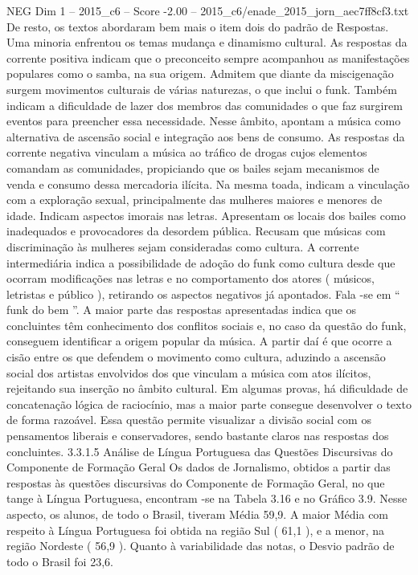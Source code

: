 \begin{textsample}{NEG Dim 1 – 2015\_c6 – Score -2.00 – 2015\_c6/enade\_2015\_jorn\_aec7ff8cf3.txt}
De resto, os textos abordaram bem mais o item dois do padrão de Respostas.
Uma minoria enfrentou os temas mudança e dinamismo cultural.
As respostas da corrente positiva indicam que o preconceito sempre acompanhou as manifestações populares como o samba, na sua origem.
Admitem que diante da miscigenação surgem movimentos culturais de várias naturezas, o que inclui o funk.
Também indicam a dificuldade de lazer dos membros das comunidades o que faz surgirem eventos para preencher essa necessidade.
Nesse âmbito, apontam a música como alternativa de ascensão social e integração aos bens de consumo.
As respostas da corrente negativa vinculam a música ao tráfico de drogas cujos elementos comandam as comunidades, propiciando que os bailes sejam mecanismos de venda e consumo dessa mercadoria ilícita.
Na mesma toada, indicam a vinculação com a exploração sexual, principalmente das mulheres maiores e menores de idade.
Indicam aspectos imorais nas letras.
Apresentam os locais dos bailes como inadequados e provocadores da desordem pública.
Recusam que músicas com discriminação às mulheres sejam consideradas como cultura.
A corrente intermediária indica a possibilidade de adoção do funk como cultura desde que ocorram modificações nas letras e no comportamento dos atores ( músicos, letristas e público ), retirando os aspectos negativos já apontados.
Fala -se em “ funk do bem ”.
A maior parte das respostas apresentadas indica que os concluintes têm conhecimento dos conflitos sociais e, no caso da questão do funk, conseguem identificar a origem popular da música.
A partir daí é que ocorre a cisão entre os que defendem o movimento como cultura, aduzindo a ascensão social dos artistas envolvidos dos que vinculam a música com atos ilícitos, rejeitando sua inserção no âmbito cultural.
Em algumas provas, há dificuldade de concatenação lógica de raciocínio, mas a maior parte consegue desenvolver o texto de forma razoável.
Essa questão permite visualizar a divisão social com os pensamentos liberais e conservadores, sendo bastante claros nas respostas dos concluintes. 3.3.1.5 Análise de Língua Portuguesa das Questões Discursivas do Componente de Formação Geral Os dados de Jornalismo, obtidos a partir das respostas às questões discursivas do Componente de Formação Geral, no que tange à Língua Portuguesa, encontram -se na Tabela 3.16 e no Gráfico 3.9.
Nesse aspecto, os alunos, de todo o Brasil, tiveram Média 59,9.
A maior Média com respeito à Língua Portuguesa foi obtida na região Sul ( 61,1 ), e a menor, na região Nordeste ( 56,9 ).
Quanto à variabilidade das notas, o Desvio padrão de todo o Brasil foi 23,6.

\end{textsample}
